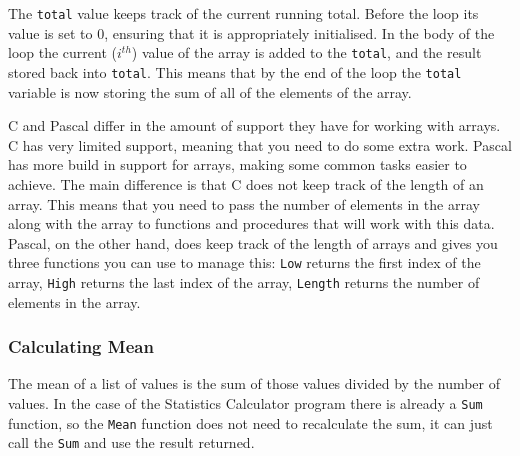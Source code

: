 The \texttt{total} value keeps track of the current running total. Before the loop its value is set to 0, ensuring that it is appropriately initialised. In the body of the loop the current ($i^{th}$) value of the array is added to the \texttt{total}, and the result stored back into \texttt{total}. This means that by the end of the loop the \texttt{total} variable is now storing the sum of all of the elements of the array.

C and Pascal differ in the amount of support they have for working with arrays. C has very limited support, meaning that you need to do some extra work. Pascal has more build in support for arrays, making some common tasks easier to achieve. The main difference is that C does not keep track of the length of an array. This means that you need to pass the number of elements in the array along with the array to functions and procedures that will work with this data. Pascal, on the other hand, does keep track of the length of arrays and gives you three functions you can use to manage this: \texttt{Low} returns the first index of the array, \texttt{High} returns the last index of the array, \texttt{Length} returns the number of elements in the array.




\subsubsection{Calculating Mean} %
\label{ssub:calculating_mean}

The mean of a list of values is the sum of those values divided by the number of values. In the case of the Statistics Calculator program there is already a \texttt{Sum} function, so the \texttt{Mean} function does not need to recalculate the sum, it can just call the \texttt{Sum} and use the result returned.

